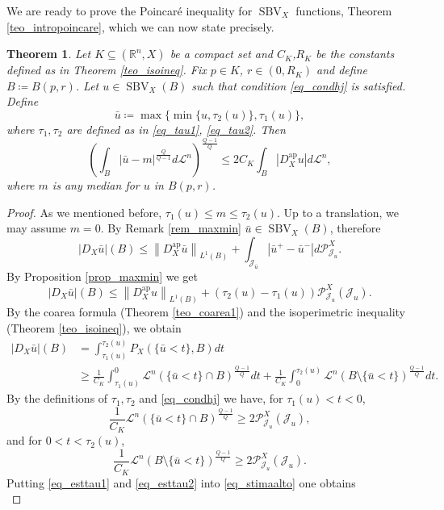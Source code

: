 \documentclass[12pt,a4paper]{amsart}
\theoremstyle{definition}
\theoremstyle{plain}
\newtheorem{teo}[defi]{Theorem}
\newcommand{\R}{\mathbb{R}}
\newcommand{\se}{\subseteq}
\newcommand{\ceq}{\coloneqq}
\newcommand{\pxu}{{\mathcal{P}^X_{\mathcal{J}_u}}}
\newcommand{\leb}{\mathcal{L}}
\newcommand{\sbv}{\operatorname{SBV}}
\newcommand{\J}{\mathcal{J}}
\newcommand{\nl}{\left\|}
\newcommand{\nr}{\right\|}
\newcommand{\ap}{{\operatorname{ap}}}
\begin{document}
We are ready to prove the Poincaré inequality for $\sbv_X$ functions, Theorem \ref{teo_intropoincare}, which we can now state precisely.
\begin{teo}
 Let $K \se (\R^n,X)$ be a compact set and $C_K$,$R_K$ be the constants defined as in Theorem \ref{teo_isoineq}. Fix $p \in K$, $r \in (0,R_K)$ and define $B \ceq B(p,r)$. Let $u \in \sbv_X(B)$ such that condition \eqref{eq_condhj} is satisfied. Define
    \[
    \bar u \ceq \max\{ \min\{u,\tau_2(u)\},\tau_1(u)\}  ,  
    \]
    where $\tau_1,\tau_2$ are defined as in \eqref{eq_tau1}, \eqref{eq_tau2}. Then
    \[
   \left( \int_{B} |\bar u-m|^\frac{Q}{Q-1}d\leb^n \right)^\frac{Q-1}{Q}\leq 2 C_K \int_{B}|D^\ap_Xu|d\leb^n,
    \]
    where $m$ is any median for $u$ in $B(p,r)$.
\end{teo}
\begin{proof}
    As we mentioned before, $\tau_1(u) \leq m \leq \tau_2(u)$. Up to a translation, we may assume $m=0$. By Remark \ref{rem_maxmin} $\bar u \in \sbv_X(B)$, therefore  
    \[
|D_X \bar u|(B) \leq \nl  D^\ap_X \bar u \nr_{L^1(B)}+\int_{\J_{\bar u}} | \bar u^+ - \bar u^-|d\pxu.
\]
By Proposition \ref{prop_maxmin} we get
\begin{equation}\label{eq_stimabasso}
|D_X \bar u|(B) \leq \nl  D^\ap_X  u \nr_{L^1(B)}+ (\tau_2(u)-\tau_1(u))\pxu(\J_u).
\end{equation}
By the coarea formula (Theorem \ref{teo_coarea1}) and the isoperimetric inequality (Theorem \ref{teo_isoineq}), we obtain
\begin{align}\label{eq_stimaalto}
|D_X \bar u|(B)& = \int_{\tau_1(u)}^{\tau_2(u)} P_X (\{ \bar u < t \},B)dt \\ &\geq \frac{1}{C_K} \int^0_{\tau_1(u)} \leb^n(\{ \bar u < t   \} \cap B)^\frac{Q-1}{Q}dt+\frac{1}{C_K}\int_0^{\tau_2(u)} \leb^n(B  \setminus \{ \bar u < t   \})^\frac{Q-1}{Q}dt. \nonumber
\end{align}
By the definitions of $\tau_1,\tau_2$ and \eqref{eq_condhj} we have, for $\tau_1(u)<t<0$,
\begin{equation}\label{eq_esttau1}
    \frac{1}{C_K}\leb^n(\{\bar u<t \} \cap B)^\frac{Q-1}{Q} \geq 2\pxu(\J_u),
\end{equation}
and for $0<t<\tau_2(u)$,
\begin{equation}\label{eq_esttau2}
    \frac{1}{C_K} \leb^n(B \setminus \{ \bar u <t \})^\frac{Q-1}{Q} \geq 2\pxu(\J_u).
\end{equation}
Putting \eqref{eq_esttau1} and \eqref{eq_esttau2} into \eqref{eq_stimaalto} one obtains
\begin{equation}\label{eq_stimaalto2}

\end{equation}
\end{proof}
\end{document}
